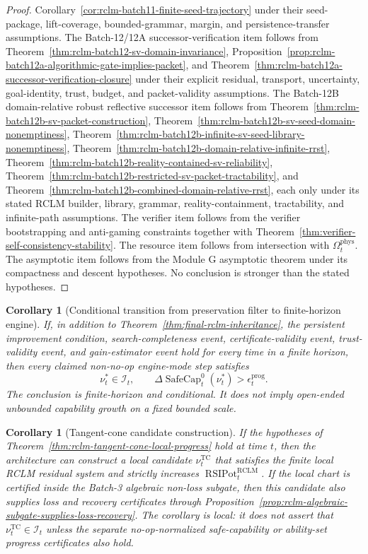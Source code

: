 \documentclass[11pt,a4paper]{article}
\newtheorem{corollary}[theorem]{Corollary}
\newcommand{\RCLM}{\mathrm{RCLM}}
\newcommand{\SafeCap}{\operatorname{SafeCap}}
\newcommand{\phys}{\mathrm{phys}}
\newcommand{\TC}{\mathrm{TC}}
\newcommand{\RSIPot}{\operatorname{RSIPot}}
\begin{document}
\begin{proof}
Corollary~\ref{cor:rclm-batch11-finite-seed-trajectory} under their seed-package, lift-coverage, bounded-grammar, margin, and persistence-transfer assumptions. The Batch-12/12A successor-verification item follows from Theorem~\ref{thm:rclm-batch12-sv-domain-invariance}, Proposition~\ref{prop:rclm-batch12a-algorithmic-gate-implies-packet}, and Theorem~\ref{thm:rclm-batch12a-successor-verification-closure} under their explicit residual, transport, uncertainty, goal-identity, trust, budget, and packet-validity assumptions. The Batch-12B domain-relative robust reflective successor item follows from Theorem~\ref{thm:rclm-batch12b-sv-packet-construction}, Theorem~\ref{thm:rclm-batch12b-sv-seed-domain-nonemptiness}, Theorem~\ref{thm:rclm-batch12b-infinite-sv-seed-library-nonemptiness}, Theorem~\ref{thm:rclm-batch12b-domain-relative-infinite-rrst}, Theorem~\ref{thm:rclm-batch12b-reality-contained-sv-reliability}, Theorem~\ref{thm:rclm-batch12b-restricted-sv-packet-tractability}, and Theorem~\ref{thm:rclm-batch12b-combined-domain-relative-rrst}, each only under its stated RCLM builder, library, grammar, reality-containment, tractability, and infinite-path assumptions. The verifier item follows from the verifier bootstrapping and anti-gaming constraints together with Theorem~\ref{thm:verifier-self-consistency-stability}.  The resource item follows from intersection with \(\Omega_t^{\phys}\).  The asymptotic item follows from the Module G asymptotic theorem under its compactness and descent hypotheses.  No conclusion is stronger than the stated hypotheses.
\end{proof}


\begin{corollary}[Conditional transition from preservation filter to finite-horizon engine]
\label{cor:safety-filter-to-engine}
If, in addition to Theorem~\ref{thm:final-rclm-inheritance}, the persistent improvement condition, search-completeness event, certificate-validity event, trust-validity event, and gain-estimator event hold for every time in a finite horizon, then every claimed non-no-op engine-mode step satisfies
\[
\nu_t^*\in\mathcal I_t,
\qquad
\Delta\SafeCap_t^0(\nu_t^*)>\epsilon_t^{\mathrm{prog}}.
\]
The conclusion is finite-horizon and conditional. It does not imply open-ended unbounded capability growth on a fixed bounded scale.
\end{corollary}


\begin{corollary}[Tangent-cone candidate construction]
\label{cor:rclm-tangent-cone-candidate-construction-main}
If the hypotheses of Theorem~\ref{thm:rclm-tangent-cone-local-progress} hold at time \(t\), then the architecture can construct a local candidate \(\nu_t^{\TC}\) that satisfies the finite local RCLM residual system and strictly increases \(\RSIPot_t^{\RCLM}\).  If the local chart is certified inside the Batch-3 algebraic non-loss subgate, then this candidate also supplies loss and recovery certificates through Proposition~\ref{prop:rclm-algebraic-subgate-supplies-loss-recovery}.  The corollary is local: it does not assert that \(\nu_t^{\TC}\in\mathcal I_t\) unless the separate no-op-normalized safe-capability or ability-set progress certificates also hold.
\end{corollary}
\end{document}
